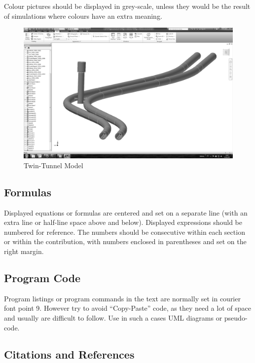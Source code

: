 \documentclass[12pt]{article}
\begin{document}
Colour pictures should be displayed in grey-scale, unless they would be the result of simulations where colours have an extra meaning.

\begin{figure}[!ht]
	\begin{center}
	\includegraphics[width=140mm]{figure2.png}
	\caption{Twin-Tunnel Model}
	\label{figure:example2}
	\end{center}
\end{figure}

\subsection{Formulas}

Displayed equations or formulas are centered and set on a separate line (with an extra line or half-line space above and below). Displayed expressions should be numbered for reference. The numbers should be consecutive within each section or within the contribution, with numbers enclosed in parentheses and set on the right margin. 

\subsection{Program Code}

Program listings or program commands in the text are normally set in courier font point 9. However try to avoid “Copy-Paste” code, as they need a lot of space and usually are difficult to follow. Use in such a cases UML diagrams or pseudo-code.

\subsection{Citations and References}
\end{document}
